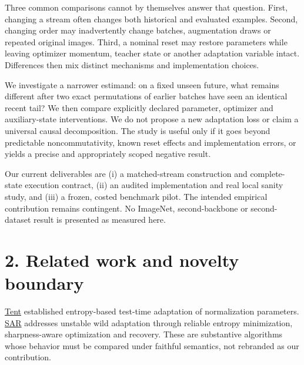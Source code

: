 \documentclass[11pt]{article}
\begin{document}
Three common comparisons cannot by themselves answer that question. First, changing a stream often changes both historical and evaluated examples. Second, changing order may inadvertently change batches, augmentation draws or repeated original images. Third, a nominal reset may restore parameters while leaving optimizer momentum, teacher state or another adaptation variable intact. Differences then mix distinct mechanisms and implementation choices.

We investigate a narrower estimand: on a fixed unseen future, what remains different after two exact permutations of earlier batches have seen an identical recent tail? We then compare explicitly declared parameter, optimizer and auxiliary-state interventions. We do not propose a new adaptation loss or claim a universal causal decomposition. The study is useful only if it goes beyond predictable noncommutativity, known reset effects and implementation errors, or yields a precise and appropriately scoped negative result.

Our current deliverables are (i) a matched-stream construction and complete-state execution contract, (ii) an audited implementation and real local sanity study, and (iii) a frozen, costed benchmark pilot. The intended empirical contribution remains contingent. No ImageNet, second-backbone or second-dataset result is presented as measured here.

\section*{2. Related work and novelty boundary}

\href{https://openreview.net/forum?id=uXl3bZLkr3c}{Tent} established entropy-based test-time adaptation of normalization parameters. \href{https://arxiv.org/abs/2302.12400}{SAR} addresses unstable wild adaptation through reliable entropy minimization, sharpness-aware optimization and recovery. These are substantive algorithms whose behavior must be compared under faithful semantics, not rebranded as our contribution.
\end{document}
